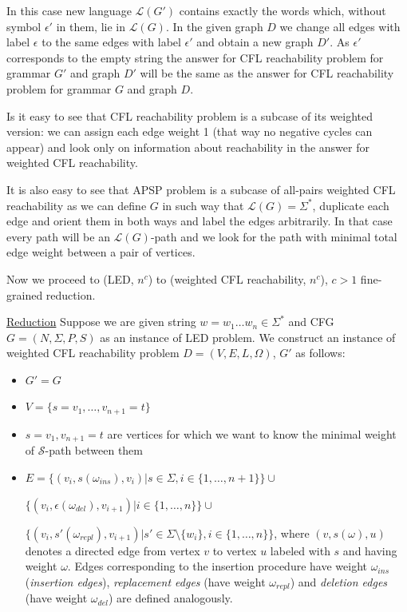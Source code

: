 \documentclass[12pt]{article}
\begin{document}
In this case new language $\mathcal{L}(G')$ contains exactly the words which, without symbol $\epsilon'$ in them, lie in $\mathcal{L}(G)$. In the given graph $D$ we change all edges with label $\epsilon$ to the same edges with label $\epsilon'$ and obtain a new graph $D'$. As $\epsilon'$ corresponds to the empty string the answer for CFL reachability problem for grammar $G'$ and graph $D'$ will be the same as the answer for CFL reachability problem for grammar $G$ and graph $D$.

Is it easy to see that CFL reachability problem is a subcase of its weighted version: we can assign each edge weight 1 (that way no negative cycles can appear) and look only on information about reachability in the answer for weighted CFL reachability.

It is also easy to see that APSP problem is a subcase of all-pairs weighted CFL reachability as we can define $G$ in such way that $\mathcal{L}(G) = \Sigma^*$, duplicate each edge and orient them in both ways and label the edges arbitrarily. In that case every path will be an $\mathcal{L}(G)$-path and we look for the path with minimal total edge weight between a pair of vertices. 

Now we proceed to (LED, $n^c$) to (weighted CFL reachability, $n^c$), $c > 1$ fine-grained reduction.

\underline{Reduction} Suppose we are given string $w = w_1\ldots w_n \in \Sigma^*$ and CFG $G = (N, \Sigma, P, S)$ as an instance of LED problem. We construct an instance of weighted CFL reachability problem $D = (V, E, L, \Omega)$, $G'$ as follows:

\begin{itemize}
    \item $G' = G$
    \item $V = \{s = v_1, \ldots, v_{n+1} = t\}$
    \item $s = v_1, v_{n+1} = t$ are vertices for which we want to know the minimal weight of $\mathcal{S}$-path between them
    \item $E = \{(v_i, s(\omega_{ins}), v_i)|s \in \Sigma, i \in \{1, \ldots, n+1\}\} \cup$ 
    
    $\{(v_i, \epsilon(\omega_{del}), v_{i + 1})|i \in \{1, \ldots, n\}\} \cup$
    
    $\{(v_i, s'(\omega_{repl}), v_{i + 1})|s' \in \Sigma \setminus \{w_i\}, i \in \{1, \ldots, n\}\}$, where $(v, s(\omega), u)$ denotes a directed edge from vertex $v$ to vertex $u$ labeled with $s$ and having weight $\omega$. Edges corresponding to the insertion procedure have weight $\omega_{ins}$ (\emph{insertion edges}), \emph{replacement edges} (have weight $\omega_{repl}$) and \emph{deletion edges} (have weight $\omega_{del}$) are defined analogously.
\end{itemize}
\end{document}

